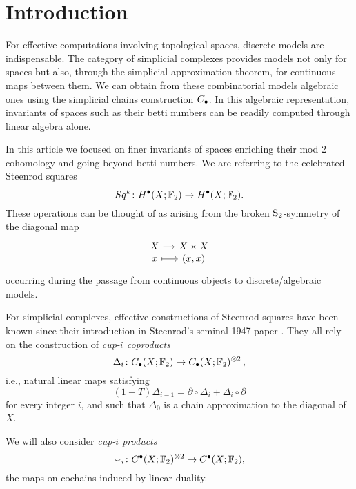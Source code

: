 
\section{Introduction}

For effective computations involving topological spaces, discrete models are indispensable.
The category of simplicial complexes provides models not only for spaces but also, through the simplicial approximation theorem, for continuous maps between them.
We can obtain from these combinatorial models algebraic ones using the simplicial chains construction $\chains$.
In this algebraic representation, invariants of spaces such as their betti numbers can be readily computed through linear algebra alone.

In this article we focused on finer invariants of spaces enriching their mod 2 cohomology and going beyond betti numbers.
We are referring to the celebrated Steenrod squares
\begin{equation*}
Sq^k \colon H^\bullet(X; \F_2) \to H^\bullet(X; \F_2).
\end{equation*}
These operations can be thought of as arising from the broken $\S_2$-symmetry of the diagonal map
\begin{equation*}
\begin{tikzcd}[column sep=small, row sep=-3pt]
X \arrow[r] & X \times X \\
x \arrow[r, mapsto] & (x,x)
\end{tikzcd}
\end{equation*}
occurring during the passage from continuous objects to discrete/algebraic models.

For simplicial complexes, effective constructions of Steenrod squares have been known since their introduction in Steenrod's seminal 1947 paper \cite{steenrod47}.
They all rely on the construction of \textit{cup-$i$ coproducts}
\begin{equation*}
\Delta_i \colon \chains(X; \F_2)  \to \chains(X; \F_2)^{\otimes 2}\,,
\end{equation*}
i.e., natural linear maps satisfying
\begin{equation*}
(1 + T) \Delta_{i-1} = \partial \circ \Delta_i + \Delta_i \circ \partial
\end{equation*}
for every integer $i$, and such that $\Delta_0$ is a chain approximation to the diagonal of $X$.

We will also consider \textit{cup-$i$ products}
\begin{equation*}
\smallsmile_i \colon \cochains(X; \F_2)^{\otimes 2} \to \cochains(X; \F_2),
\end{equation*}
the maps on cochains induced by linear duality.

